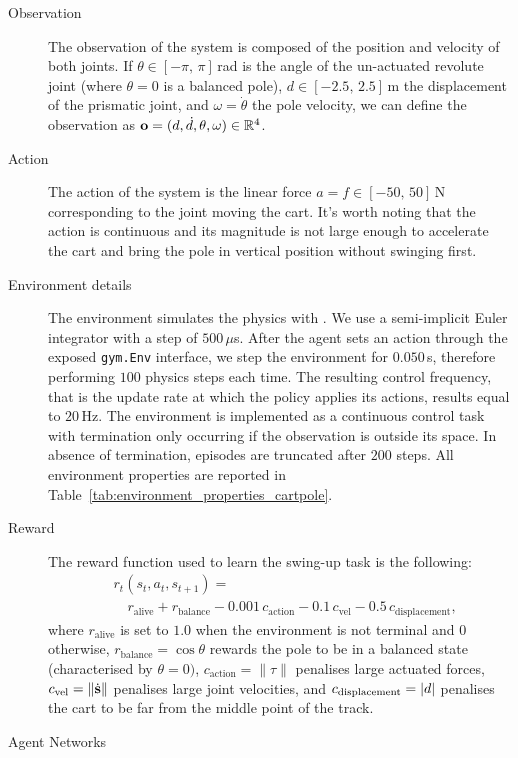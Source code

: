 \begin{description}
%
\item[Observation]
The observation of the system is composed of the position and velocity of both joints.
If $\theta \in [-\pi,\, \pi]\,$rad is the angle of the un-actuated revolute joint (where $\theta = 0$ is a balanced pole), $d \in [-2.5,\, 2.5]\,$m the displacement of the prismatic joint, and $\omega = \dot{\theta}$ the pole velocity, we can define the observation as $\mathbf{o} = ( d, \dot{d}, \theta, \omega) \in \mathbb{R}^4$.
%
\item[Action]
The action of the system is the linear force $a = f \in [-50,\, 50]\,\text{N}$ corresponding to the joint moving the cart.
It's worth noting that the action is continuous and its magnitude is not large enough to accelerate the cart and bring the pole in vertical position without swinging first.
%
\item[Environment details]
The environment simulates the physics with \jaxsim.
We use a semi-implicit Euler integrator with a step of $500\,\mu$s.
After the agent sets an action through the exposed \texttt{gym.Env} interface, we step the environment for $0.050\,$s, therefore performing $100$ physics steps each time.
The resulting control frequency, that is the update rate at which the policy applies its actions, results equal to $20\,$Hz.
The environment is implemented as a continuous control task with termination only occurring if the observation is outside its space.
In absence of termination, episodes are truncated after $200$ steps.
All environment properties are reported in Table~\ref{tab:environment_properties_cartpole}.
%
\item[Reward]
The reward function used to learn the swing-up task is the following:
%
\begin{align*}
    &r_t(s_t, a_t, s_{t+1}) = \\
    &\quad r_{\text{alive}} + r_{\text{balance}} - 0.001 \, c_{\text{action}} - 0.1 \, c_{\text{vel}} - 0.5 \, c_{\text{displacement}}
    ,
\end{align*}
%
where $r_{\text{alive}}$ is set to $1.0$ when the environment is not terminal and $0$ otherwise, $r_{\text{balance}} = \cos{\theta}$ rewards the pole to be in a balanced state (characterised by $\theta=0)$, $c_{\text{action}} = \lVert \tau \rVert$ penalises large actuated forces, $c_{\text{vel}} = \lVert \dot{\mathbf{s}} \rVert$ penalises large joint velocities, and $c_{\text{displacement}} = \abs{d}$ penalises the cart to be far from the middle point of the track.
%
\item[Agent Networks]

\end{description}
